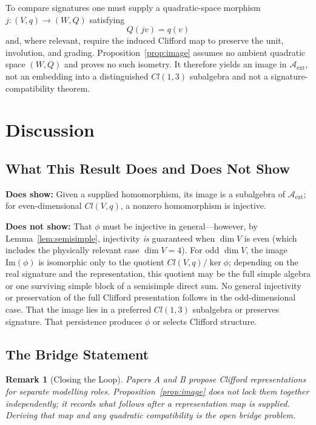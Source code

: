 \documentclass[12pt]{article}
\newtheorem{remark}[theorem]{Remark}
\begin{document}
To compare signatures one must supply a quadratic-space morphism $j:(V,q)\to(W,Q)$ satisfying
\begin{equation}
Q(jv)=q(v)
\end{equation}
and, where relevant, require the induced Clifford map to preserve the unit, involution, and grading.  Proposition~\ref{prop:image} assumes no ambient quadratic space $(W,Q)$ and proves no such isometry.  It therefore yields an image in $\mathcal A_{\mathrm{ext}}$, not an embedding into a distinguished $Cl(1,3)$ subalgebra and not a signature-compatibility theorem.

\section{Discussion}
\label{sec:discussion}

\subsection{What This Result Does and Does Not Show}

\textbf{Does show:}
Given a supplied homomorphism, its image is a subalgebra of $\mathcal A_{\mathrm{ext}}$; for even-dimensional $Cl(V,q)$, a nonzero homomorphism is injective.

\textbf{Does not show:}
That $\phi$ must be injective in general---however,
by Lemma~\ref{lem:semisimple}, injectivity \emph{is}
guaranteed when $\dim V$ is even
(which includes the physically relevant case $\dim V = 4$).
For odd $\dim V$, the image $\mathrm{Im}(\phi)$ is
isomorphic only to the quotient $Cl(V,q)/\ker\phi$; depending on the
real signature and the representation, this quotient may be the full
simple algebra or one surviving simple block of a semisimple direct sum.
No general injectivity or preservation of the full Clifford presentation
follows in the odd-dimensional case.
That the image lies in a preferred $Cl(1,3)$ subalgebra or preserves signature.
That persistence produces $\phi$ or selects Clifford structure.

\subsection{The Bridge Statement}

\begin{remark}[Closing the Loop]
Papers A and B propose Clifford representations for separate modelling roles.  Proposition~\ref{prop:image} does not lock them together independently; it records what follows after a representation map is supplied.  Deriving that map and any quadratic compatibility is the open bridge problem.
\end{remark}
\end{document}
